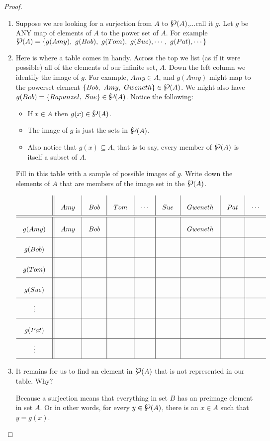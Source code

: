 \begin{proof}
\begin{enumerate}
\item Suppose we are looking for a surjection from $A$ to $\powerset(A)$,...call it $g$.  Let $g$ be ANY map of  elements of $A$ to the power set of $A$.  For example $\powerset(A)  =\{g(Amy), ~g(Bob), ~g(Tom), ~g(Sue), \cdots,~ g(Pat),\cdots \}$


\item  Here is where a table comes in handy.   Across the top we list (as if it were possible) all of the elements of our infinite set, $A$.  Down the left column we identify the image of $g$.  For example, $Amy\in A$, and $g(Amy)$ might map to the powerset element $\{ Bob, ~Amy, ~Gweneth\}\in \powerset(A)$.  We might also have $g(Bob) = \{Rapunzel,~ Sue\}\in \powerset(A)$.  Notice the following:
\begin{itemize}
\item If $x\in A$ then $g(x)\in\powerset(A)$.  
\item The image of $g$ is just the sets in $\powerset(A)$.  
\item Also notice that $g(x)\subseteq A$, that is to say, every member of $\powerset(A)$ is itself a subset of $A$.
\end{itemize}
Fill in this table with a sample of possible images of $g$.  Write down the elements of $A$ that are members of the image set in the $\powerset(A)$.  

\[
\arraycolsep=10pt\def\arraystretch{2.5}
\begin{array}{c||r|r|r|r|r|r|r|r}
		&Amy & Bob & Tom & \cdots & Sue & Gweneth &Pat & \cdots \\
\hline\hline
g(Amy) & Amy & Bob &   &  & &Gweneth  &  & \\
\hline
g(Bob)  &    &   &   &   &&  &   &  \\
\hline
g(Tom)  &    &   &  &   & & &   &   \\
\hline
g(Sue)  &   &    &  &   &  &&   &   \\
\hline
\vdots &   &   &   &  &    &   &&  \\
\hline
g(Pat)  &   &  &   &  &   &    &&   \\
\hline
\vdots &   &   &   &  &   &    &&  \\
\hline
\end{array}
\]

\item It remains for us to find an element in $\powerset(A)$ that is not represented in our table.  Why?

\ifKey
\hfill \begin{minipage}{0.5\textwidth}\color{red}
Because a surjection means that everything in set $B$ has an preimage element in set $A$.  Or in other words, for every $y\in \powerset(A)$, there is an $x\in A$ such that $y = g(x)$.
\color{black}\end{minipage}
\fi


\end{enumerate}
\end{proof}
